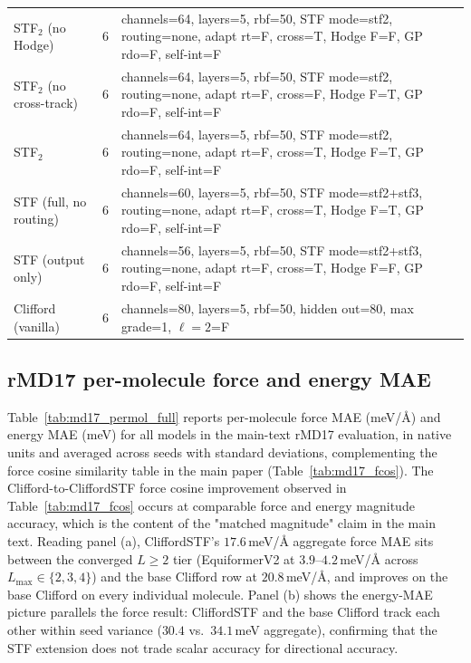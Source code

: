 \begin{table}[h]
{\begin{tabular}{l c l}
STF$_2$ (no Hodge) & 6 & channels=64, layers=5, rbf=50, STF mode=stf2, routing=none, adapt rt=F, cross=T, Hodge F=F, GP rdo=F, self-int=F \\
STF$_2$ (no cross-track) & 6 & channels=64, layers=5, rbf=50, STF mode=stf2, routing=none, adapt rt=F, cross=F, Hodge F=T, GP rdo=F, self-int=F \\
STF$_2$ & 6 & channels=64, layers=5, rbf=50, STF mode=stf2, routing=none, adapt rt=F, cross=T, Hodge F=T, GP rdo=F, self-int=F \\
STF (full, no routing) & 6 & channels=60, layers=5, rbf=50, STF mode=stf2+stf3, routing=none, adapt rt=F, cross=T, Hodge F=T, GP rdo=F, self-int=F \\
STF (output only) & 6 & channels=56, layers=5, rbf=50, STF mode=stf2+stf3, routing=none, adapt rt=F, cross=T, Hodge F=F, GP rdo=F, self-int=F \\
Clifford (vanilla) & 6 & channels=80, layers=5, rbf=50, hidden out=80, max grade=1, $\ell{=}2$=F \\
\bottomrule
\end{tabular}%
}
\end{table}

\subsection{rMD17 per-molecule force and energy MAE}\label{supp:md17_permol}

Table~\ref{tab:md17_permol_full} reports per-molecule force MAE (meV/\AA) and energy MAE (meV) for all models in the main-text rMD17 evaluation, in native units and averaged across seeds with standard deviations, complementing the force cosine similarity table in the main paper (Table~\ref{tab:md17_fcos}). The Clifford-to-CliffordSTF force cosine improvement observed in Table~\ref{tab:md17_fcos} occurs at comparable force and energy magnitude accuracy, which is the content of the "matched magnitude" claim in the main text. Reading panel (a), CliffordSTF's $17.6$\,meV/\AA{} aggregate force MAE sits between the converged $L\!\geq\!2$ tier (EquiformerV2 at $3.9$--$4.2$\,meV/\AA{} across $L_{\max}\!\in\!\{2,3,4\}$) and the base Clifford row at $20.8$\,meV/\AA{}, and improves on the base Clifford on every individual molecule. Panel (b) shows the energy-MAE picture parallels the force result: CliffordSTF and the base Clifford track each other within seed variance ($30.4$ vs.\ $34.1$\,meV aggregate), confirming that the STF extension does not trade scalar accuracy for directional accuracy.


